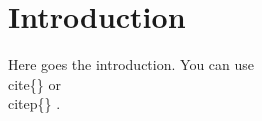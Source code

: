 \documentclass[msc,proposal,hideall,showtitle,showcover,showtoc]{ppgccufmg}  %
\begin{document}

\chapter{Introduction} \label{chap:introduction}

Here goes the introduction. You can use \\cite\{\} \cite{112493} or \\citep\{\} \citep{112493}.


\end{document}
